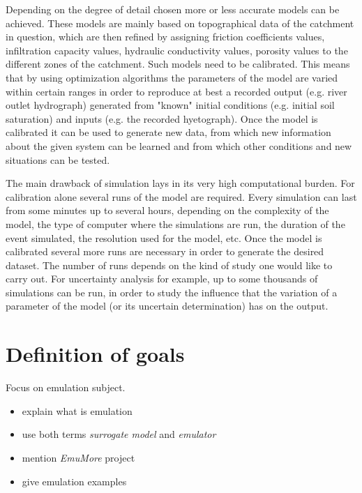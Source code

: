 Depending on the degree of detail chosen more or less accurate models can be achieved.
These models are mainly based on topographical data of the catchment in question, which are then refined by assigning friction coefficients values, infiltration capacity values, hydraulic conductivity values, porosity values to the different zones of the catchment.
Such models need to be calibrated.
This means that by using optimization algorithms the parameters of the model are varied within certain ranges in order to reproduce at best a recorded output (e.g. river outlet hydrograph) generated from "known" initial conditions (e.g. initial soil saturation) and inputs (e.g. the recorded hyetograph).
Once the model is calibrated it can be used to generate new data, from which new information about the given system can be learned and from which other conditions and new situations can be tested.

The main drawback of simulation lays in its very high computational burden.
For calibration alone several runs of the model are required.
Every simulation can last from some minutes up to several hours, depending on the complexity of the model, the type of computer where the simulations are run, the duration of the event simulated, the resolution used for the model, etc.
Once the model is calibrated several more runs are necessary in order to generate the desired dataset.
The number of runs depends on the kind of study one would like to carry out.
For uncertainty analysis for example, up to some thousands of simulations can be run, in order to study the influence that the variation of a parameter of the model (or its uncertain determination) has on the output.\\




\section{Definition of goals}

Focus on emulation subject.

\begin{itemize}
\itemsep0em
  \item explain what is emulation
  \item use both terms \textit{surrogate model} and \textit{emulator}
  \item mention \textit{EmuMore} project
  \item give emulation examples
\end{itemize}


